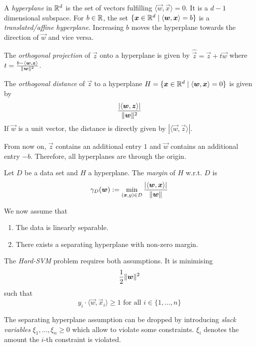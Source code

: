 A \emph{hyperplane} in $\mathbb{R}^d$ is the
set of vectors fulfilling
$\langle \vec{w}, \vec{x} \rangle = 0$.
It is a $d-1$ dimensional subspace.
For $b \in \mathbb{R}$, the set
$\{\boldsymbol{x} \in \mathbb{R}^d \mid \langle \boldsymbol{w}, \boldsymbol{x} \rangle = b\}$
is a \emph{translated/affine hyperplane}.
Increasing $b$ moves the hyperplane towards
the direction of $\vec{w}$ and vice versa.

The \emph{orthogonal projection} of $\vec{z}$
onto a hyperplane is given by $\hat{\vec{z}} = \vec{z} + t \vec{w}$
where $t = \frac{b - \langle \boldsymbol{w}, \boldsymbol{z} \rangle}{\lVert\boldsymbol{w}\rVert^2}$.

The \emph{orthogonal distance} of $\vec{z}$ to a
hyperplane $H = \{\boldsymbol{x} \in \mathbb{R}^d \mid \langle \boldsymbol{w}, \boldsymbol{x} \rangle = 0\}$
is given by
\begin{equation*}
\frac{| \langle \boldsymbol{w}, \boldsymbol{z} \rangle |}{\lVert\boldsymbol{w}\rVert^2}
\end{equation*}
If $\vec{w}$ is a unit vector, the distance is directly
given by $|\langle \vec{w}, \vec{z} \rangle|$.

From now on, $\vec{z}$ contains an additional entry
$1$ and $\vec{w}$ contains an additional entry $-b$.
Therefore, all hyperplanes are through the origin.

Let $D$ be a data set and $H$ a hyperplane.
The \emph{margin} of $H$ w.r.t. $D$ is
\begin{equation*}
\gamma_D(\boldsymbol{w}) := \min_{(\boldsymbol{x}, y) \in D}{
	\frac{|\langle \boldsymbol{w}, \boldsymbol{x} \rangle |}{\lVert\boldsymbol{w}\rVert}
}
\end{equation*}

We now assume that
\begin{enumerate}
	\item The data is linearly separable.
	\item There exists a separating hyperplane with non-zero margin.
\end{enumerate}

The \emph{Hard-SVM} problem requires both assumptions.
It is minimising
\begin{equation*}
\frac{1}{2} \lVert\boldsymbol{w}\rVert^2
\end{equation*}
such that
\begin{equation*}
y_i \cdot \langle \vec{w}, \vec{x}_i \rangle
\geq 1 \text{ for all $i \in \{1, \dotsc, n\}$}
\end{equation*}

The separating hyperplane assumption can be
dropped by introducing \emph{slack variables}
$\xi_1, \dotsc, \xi_n \geq 0$
which allow to violate some constraints.
$\xi_i$ denotes the amount the
$i$-th constraint is violated.

